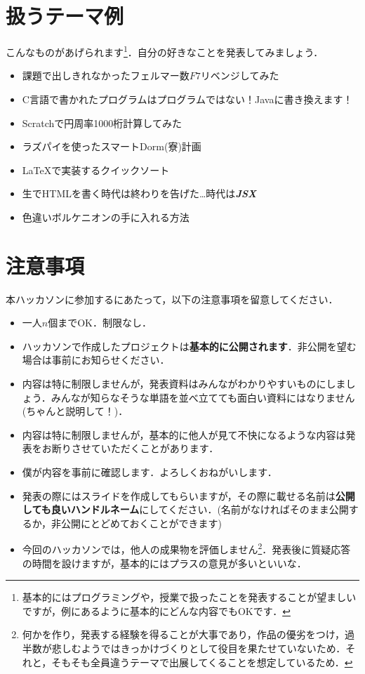 \documentclass[a4j]{jarticle}
\begin{document}
\section{扱うテーマ例}
こんなものがあげられます\footnote{基本的にはプログラミングや，授業で扱ったことを発表することが望ましいですが，例にあるように基本的にどんな内容でもOKです．}．自分の好きなことを発表してみましょう．
\begin{itemize}
    \item 課題で出しきれなかったフェルマー数$F7$リベンジしてみた
    \item C言語で書かれたプログラムはプログラムではない！Javaに書き換えます！
    \item Scratchで円周率1000桁計算してみた
    \item ラズパイを使ったスマートDorm(寮)計画
    \item \LaTeX で実装するクイックソート
    \item 生でHTMLを書く時代は終わりを告げた\dots 時代は\textdagger \textit{\textbf{JSX}} \textdagger
    \item 色違いボルケニオンの手に入れる方法
\end{itemize}

\section{注意事項}
本ハッカソンに参加するにあたって，以下の注意事項を留意してください．
\begin{itemize}
    \item 一人$n$個までOK．制限なし．
    \item ハッカソンで作成したプロジェクトは\textbf{基本的に公開されます}．非公開を望む場合は事前にお知らせください．
    \item 内容は特に制限しませんが，発表資料はみんながわかりやすいものにしましょう．みんなが知らなそうな単語を並べ立てても面白い資料にはなりません(ちゃんと説明して！)．
    \item 内容は特に制限しませんが，基本的に他人が見て不快になるような内容は発表をお断りさせていただくことがあります．
    \item 僕が内容を事前に確認します．よろしくおねがいします．
    \item 発表の際にはスライドを作成してもらいますが，その際に載せる名前は\textbf{公開しても良いハンドルネーム}にしてください．(名前がなければそのまま公開するか，非公開にとどめておくことができます)
    \item 今回のハッカソンでは，他人の成果物を評価しません\footnote{何かを作り，発表する経験を得ることが大事であり，作品の優劣をつけ，過半数が悲しむようではきっかけづくりとして役目を果たせていないため．それと，そもそも全員違うテーマで出展してくることを想定しているため．}．発表後に質疑応答の時間を設けますが，基本的にはプラスの意見が多いといいな．
\end{itemize}
\end{document}
